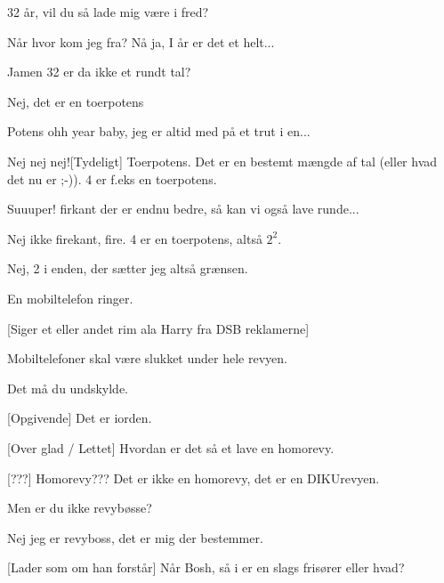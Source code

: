 \documentclass[a4paper]{article}
\begin{document}
\begin{sketch}
   32 år, vil du så lade mig være i fred?
  
  
   Når hvor kom jeg fra? Nå ja, I år er det et helt...
  
   Jamen 32 er da ikke et rundt tal?
  
   Nej, det er en toerpotens
  
   Potens ohh year baby, jeg er altid med på et
  trut i en...
  
   Nej nej nej![Tydeligt] Toerpotens. Det
  er en bestemt mængde af tal (eller hvad det nu er ;-)). 4 er f.eks
  en toerpotens.
  
   Suuuper! firkant der er endnu bedre,
  så kan vi også lave runde...
  
   Nej ikke firekant, fire. 4 er en
  toerpotens, altså $2^{2}$.
  
   Nej, 2 i enden, der
  sætter jeg altså grænsen.
  
  \scene En mobiltelefon ringer.
  
  [Siger et eller andet rim ala Harry fra DSB reklamerne]
  
   Mobiltelefoner skal være slukket under
  hele revyen.

   Det må du
  undskylde.
  
  [Opgivende] Det er iorden.
  
  [Over glad / Lettet] Hvordan er det så et lave en homorevy.
  
  [???] Homorevy??? Det er ikke en homorevy, det er en DIKUrevyen.
  
  Men er du ikke revybøsse?

  Nej jeg er revyboss, det er mig der bestemmer.
  
  [Lader som om han forstår] Når Bosh, så i er en slags
  frisører eller hvad? 
  

\end{sketch}
\end{document}
